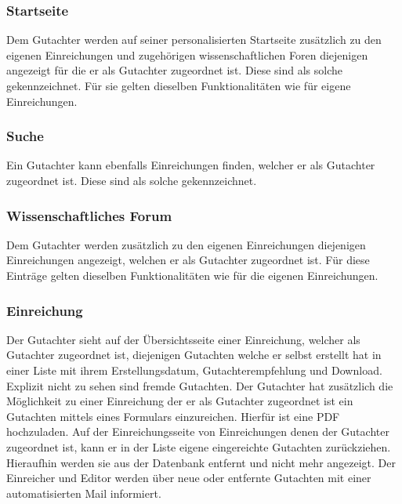 \subsubsection{Startseite}
\begin{description}
     Dem Gutachter werden auf seiner personalisierten Startseite zusätzlich zu den eigenen
    Einreichungen und zugehörigen wissenschaftlichen Foren diejenigen angezeigt für die er als Gutachter
    zugeordnet ist. Diese sind als solche gekennzeichnet.
    Für sie gelten dieselben Funktionalitäten wie für eigene Einreichungen. %
\end{description}

\subsubsection{Suche}
\begin{description}
     Ein Gutachter kann ebenfalls Einreichungen finden, welcher er als Gutachter
    zugeordnet ist. Diese sind als solche gekennzeichnet.
\end{description}

\subsubsection{Wissenschaftliches Forum}
\begin{description}
     Dem Gutachter werden zusätzlich zu den eigenen Einreichungen diejenigen Einreichungen angezeigt,
    welchen er als Gutachter zugeordnet ist. Für diese Einträge gelten dieselben Funktionalitäten wie für die
    eigenen Einreichungen. %
\end{description}

\subsubsection{Einreichung}
\begin{description}
     Der Gutachter sieht auf der Übersichtsseite einer Einreichung, welcher als Gutachter
    zugeordnet ist, diejenigen Gutachten welche er selbst erstellt hat in einer
    Liste mit ihrem Erstellungsdatum, Gutachterempfehlung und Download. Explizit nicht zu sehen sind fremde Gutachten.
     Der Gutachter hat zusätzlich die Möglichkeit zu einer Einreichung der er als Gutachter zugeordnet ist
    ein Gutachten mittels eines Formulars einzureichen. Hierfür ist eine PDF hochzuladen.
     Auf der Einreichungsseite von Einreichungen denen der Gutachter zugeordnet ist,
    kann er in der Liste eigene eingereichte Gutachten zurückziehen. Hieraufhin werden sie aus
    der Datenbank entfernt und nicht mehr angezeigt.
     Der Einreicher und Editor werden über neue oder entfernte Gutachten mit einer automatisierten
    Mail informiert.
\end{description}

